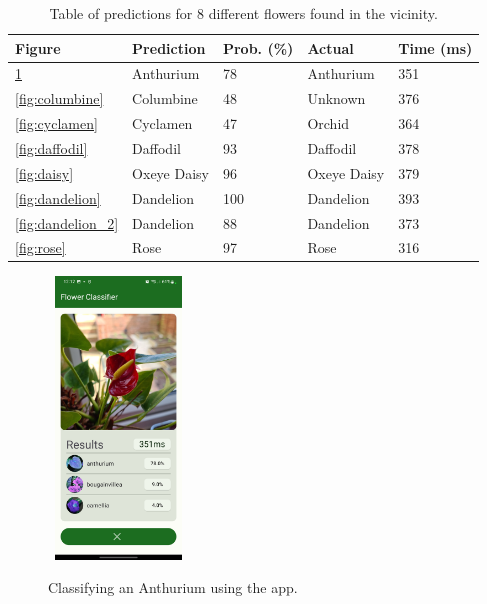 \documentclass[12pt,a4paper]{report}
\begin{document}
\begin{table}[h!]
    \begin{tabular}{ |l|l|l|l|l| }
        \hline
        Figure & Prediction & Prob. (\%) & Actual & Time (ms) \\
        \hline
        \ref{fig:anthurium} & Anthurium & 78 & Anthurium & 351 \\
        \hline
        \ref{fig:columbine} & Columbine & 48 & Unknown & 376 \\
        \hline
        \ref{fig:cyclamen} & Cyclamen & 47 & Orchid & 364 \\
        \hline
        \ref{fig:daffodil} & Daffodil & 93 & Daffodil & 378 \\
        \hline
        \ref{fig:daisy} & Oxeye Daisy & 96 & Oxeye Daisy & 379 \\
        \hline
        \ref{fig:dandelion} & Dandelion & 100 & Dandelion & 393 \\
        \hline
        \ref{fig:dandelion_2} & Dandelion & 88 & Dandelion & 373 \\
        \hline
        \ref{fig:rose} & Rose & 97 & Rose & 316 \\
        \hline
    \end{tabular}
    \caption{Table of predictions for 8 different flowers found in the vicinity.}
    \label{table:results}
\end{table}

\clearpage

\begin{figure}[h]\
    \includegraphics[width=0.3\textwidth]{anthurium.jpg}
    \caption{Classifying an Anthurium using the app.}
    \label{fig:anthurium}
\end{figure}
\end{document}
